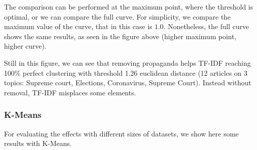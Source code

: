 The comparison can be performed at the maximum point, where the threshold is optimal, %
or we can compare the full curve. For simplicity, we compare the maximum value of the curve, that in this case is $1.0$.
Nonetheless, the full curve shows the same results, as seen in the figure above (higher maximum point, higher curve).

Still in this figure, we can see that removing propaganda helps TF-IDF reaching 100\% perfect clustering with threshold 1.26 euclidean distance (12 articles on 3 topics: Supreme court, Elections, Coronavirus, Supreme Court). Instead without removal, TF-IDF misplaces some elements.


\subsubsection{K-Means}
For evaluating the effects with different sizes of datasets, we show here some results with K-Means.

